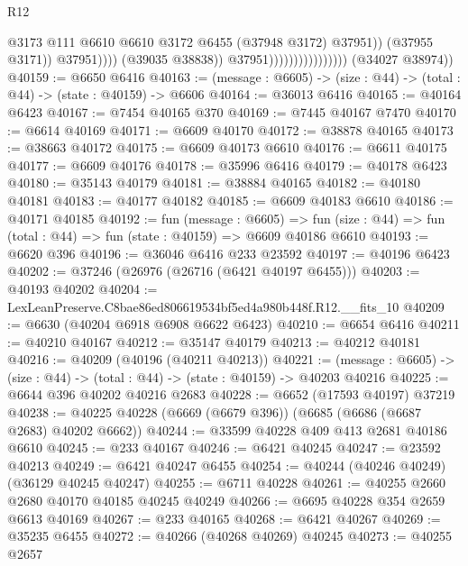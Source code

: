 \begin{lexlean}{R12}
\begin{coremodule}
                                                      @3173
                                                      @111
                                                      @6610
                                                      @6610
                                                      @3172
                                                      @6455
                                                      (@37948 @3172)
                                                      @37951))
                                                  (@37955 @3171))
                                                @37951))))
                                        (@39035 @38838))
                                      @37951))))))))))))))))
      (@34027 @38974))
@40159 := @6650 @6416
@40163 := (message : @6605) -> (size : @44) -> (total : @44) -> (state : @40159) -> @6606
@40164 := @36013 @6416
@40165 := @40164 @6423
@40167 := @7454 @40165 @370
@40169 := @7445 @40167 @7470
@40170 := @6614 @40169
@40171 := @6609 @40170
@40172 := @38878 @40165
@40173 := @38663 @40172
@40175 := @6609 @40173 @6610
@40176 := @6611 @40175
@40177 := @6609 @40176
@40178 := @35996 @6416
@40179 := @40178 @6423
@40180 := @35143 @40179
@40181 := @38884 @40165
@40182 := @40180 @40181
@40183 := @40177 @40182
@40185 := @6609 @40183 @6610
@40186 := @40171 @40185
@40192 := fun (message : @6605) =>
  fun (size : @44) => fun (total : @44) => fun (state : @40159) => @6609 @40186 @6610
@40193 := @6620 @396
@40196 := @36046 @6416 @233 @23592
@40197 := @40196 @6423
@40202 := @37246 (@26976 (@26716 (@6421 @40197 @6455)))
@40203 := @40193 @40202
@40204 := LexLeanPreserve.C8bae86ed806619534bf5ed4a980b448f.R12.__fits_10
@40209 := @6630 (@40204 @6918 @6908 @6622 @6423)
@40210 := @6654 @6416
@40211 := @40210 @40167
@40212 := @35147 @40179
@40213 := @40212 @40181
@40216 := @40209 (@40196 (@40211 @40213))
@40221 := (message : @6605) -> (size : @44) -> (total : @44) -> (state : @40159) -> @40203 @40216
@40225 := @6644 @396 @40202 @40216 @2683
@40228 := @6652 (@17593 @40197) @37219
@40238 := @40225 @40228 (@6669 (@6679 @396)) (@6685 (@6686 (@6687 @2683) @40202 @6662))
@40244 := @33599 @40228 @409 @413 @2681 @40186 @6610
@40245 := @233 @40167
@40246 := @6421 @40245
@40247 := @23592 @40213
@40249 := @6421 @40247 @6455
@40254 := @40244 (@40246 @40249) (@36129 @40245 @40247)
@40255 := @6711 @40228
@40261 := @40255 @2660 @2680 @40170 @40185 @40245 @40249
@40266 := @6695 @40228 @354 @2659 @6613 @40169
@40267 := @233 @40165
@40268 := @6421 @40267
@40269 := @35235 @6455
@40272 := @40266 (@40268 @40269) @40245
@40273 := @40255 @2657

\end{coremodule}
\end{lexlean}
